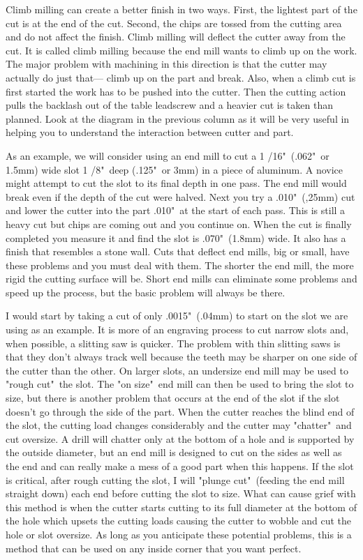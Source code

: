 Climb milling can create a better finish in two ways. First, the lightest part
of the cut is at the end of the cut. Second, the chips are tossed from the
cutting area and do not affect the finish. Climb milling will deflect the cutter
away from the cut. It is called climb milling because the end mill wants to
climb up on the work. The major problem with machining in this direction is that
the cutter may actually do just that— climb up on the part and break. Also, when
a climb cut is first started the work has to be pushed into the cutter. Then the
cutting action pulls the backlash out of the table leadscrew and a heavier cut
is taken than planned. Look at the diagram in the previous column as it will be
very useful in helping you to understand the interaction between cutter and
part.


As an example, we will consider using an end mill to cut a 1 /16"\ (.062"\ or
1.5mm) wide slot 1 /8"\ deep (.125"\ or 3mm) in a piece of aluminum. A novice
might attempt to cut the slot to its final depth in one pass. The end mill would
break even if the depth of the cut were halved. Next you try a .010"\ (,25mm) cut
and lower the cutter into the part .010"\ at the start of each pass. This is
still a heavy cut but chips are coming out and you continue on. When the cut is
finally completed you measure it and find the slot is .070"\ (1.8mm) wide. It
also has a finish that resembles a stone wall. Cuts that deflect end mills, big
or small, have these problems and you must deal with them. The shorter the end
mill, the more rigid the cutting surface will be. Short end mills can eliminate
some problems and speed up the process, but the basic problem will always be
there.

I would start by taking a cut of only .0015"\ (.04mm) to start on the slot we are
using as an example. It is more of an engraving process to cut narrow slots and,
when possible, a slitting saw is quicker. The problem with thin slitting saws is
that they don't always track well because the teeth may be sharper on one side
of the cutter than the other. On larger slots, an undersize end mill may be used
to "rough cut"\ the slot. The "on size"\ end mill can then be used to bring the
slot to size, but there is another problem that occurs at the end of the slot if
the slot doesn't go through the side of the part. When the cutter reaches the
blind end of the slot, the cutting load changes considerably and the cutter may
"chatter"\ and cut oversize. A drill will chatter only at the bottom of a hole
and is supported by the outside diameter, but an end mill is designed to cut on
the sides as well as the end and can really make a mess of a good part when this
happens. If the slot is critical, after rough cutting the slot, I will "plunge
cut"\ (feeding the end mill straight down) each end before cutting the slot to
size. What can cause grief with this method is when the cutter starts cutting to
its full diameter at the bottom of the hole which upsets the cutting loads
causing the cutter to wobble and cut the hole or slot oversize. As long as you
anticipate these potential problems, this is a method that can be used on any
inside corner that you want perfect.


